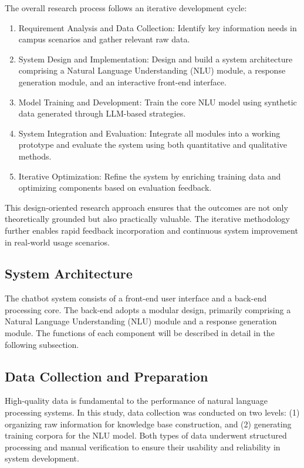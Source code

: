 \documentclass{xum_review}
\begin{document}
	The overall research process follows an iterative development cycle:
	\begin{enumerate}
		\item	Requirement Analysis and Data Collection: Identify key information needs in campus scenarios and gather
		relevant raw data.
		\item	System Design and Implementation: Design and build a system architecture comprising a Natural Language
		Understanding (NLU) module, a response generation module, and an interactive front-end interface.
		\item	Model Training and Development: Train the core NLU model using synthetic data generated through
		LLM-based strategies.
		\item	System Integration and Evaluation: Integrate all modules into a working prototype and evaluate the
		system using both quantitative and qualitative methods.
		\item	Iterative Optimization: Refine the system by enriching training data and optimizing components based on
		evaluation feedback.
	\end{enumerate}

	This design-oriented research approach ensures that the outcomes are not only theoretically grounded but also
	practically valuable. The iterative methodology further enables rapid feedback incorporation and continuous system
	improvement in real-world usage scenarios.

	\subsection{System Architecture}

	The chatbot system consists of a front-end user interface and a back-end processing core. The back-end adopts a modular
	design, primarily comprising a Natural Language Understanding (NLU) module and a response generation module. The
	functions of each component will be described in detail in the following subsection\citep{mohammed2022chatbotarchitecture}.

	\subsection{Data Collection and Preparation}

	High-quality data is fundamental to the performance of natural language processing systems. In this study, data
	collection was conducted on two levels: (1) organizing raw information for knowledge base construction, and (2)
	generating training corpora for the NLU model. Both types of data underwent structured processing and manual
	verification to ensure their usability and reliability in system development.
\end{document}
